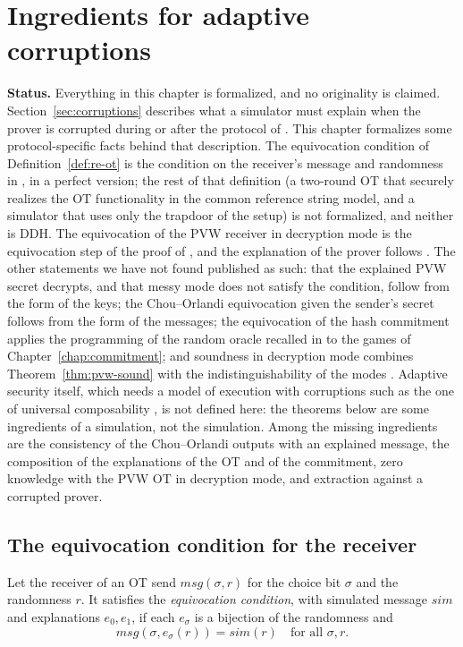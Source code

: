 \chapter{Ingredients for adaptive corruptions}
\label{chap:corruption}

\textbf{Status.} Everything in this chapter is formalized, and no originality is claimed.
Section~\ref{sec:corruptions} describes what a simulator must explain when the prover is corrupted
during or after the protocol of \cite{JKO13}. This chapter formalizes some protocol-specific facts
behind that description. The equivocation condition of Definition~\ref{def:re-ot} is the condition
on the receiver's message and randomness in \cite[Sect.~3, Definition~3.1]{GKPS18}, in a perfect
version; the rest of that definition (a two-round OT that securely realizes the OT functionality in
the common reference string model, and a simulator that uses only the trapdoor of the setup) is
not formalized, and neither is DDH. The equivocation of the PVW receiver in decryption mode is the
equivocation step of the proof of \cite[Theorem~3.2]{GKPS18}, and the explanation of the prover
follows \cite[Sect.~3.2]{GKPS18}. The other statements we have not found published as such: that
the explained PVW secret decrypts, and that messy mode does not satisfy the condition, follow from
the form of the keys; the Chou--Orlandi equivocation given the sender's secret follows from the form
of the messages; the equivocation of the hash commitment applies the programming of the random
oracle recalled in \cite[Sect.~1.2]{GKPS18} to the games of Chapter~\ref{chap:commitment}; and
soundness in decryption mode combines Theorem~\ref{thm:pvw-sound} with the indistinguishability of
the modes \cite[Theorem~5.2]{PVW08}. Adaptive security itself, which needs a model of execution
with corruptions such as the one of universal composability \cite[Sect.~7.1]{Can20}, is not
defined here: the theorems below are some ingredients of a simulation, not the simulation. Among
the missing ingredients are the consistency of the Chou--Orlandi outputs with an explained message,
the composition of the explanations of the OT and of the commitment, zero knowledge with the PVW OT
in decryption mode, and extraction against a corrupted prover.

\section{The equivocation condition for the receiver}

\begin{definition}
  \label{def:re-ot}
  \leanok
  Let the receiver of an OT send $\mathit{msg}(\sigma, r)$ for the choice bit $\sigma$ and the
  randomness $r$. It satisfies the \emph{equivocation condition}, with simulated message $\mathit{sim}$ and explanations $e_0, e_1$, if each $e_\sigma$ is a bijection of the randomness and
  \[ \mathit{msg}(\sigma, e_\sigma(r)) = \mathit{sim}(r) \quad \text{for all } \sigma, r . \]
\end{definition}

